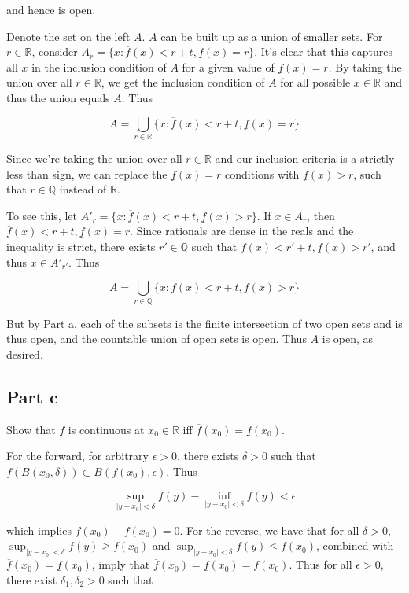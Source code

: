 \documentclass{article}
\newcommand{\R}{\mathbb{R}}
\newcommand{\Q}{\mathbb{Q}}
\begin{document}
and hence is open.

Denote the set on the left $A$. $A$ can be built up as a union of smaller sets. For $r \in \R$, consider $A_r = \{ x: \overline{f}(x)<r+t, \underline{f}(x) = r \}$. It's clear that this captures all $x$ in the inclusion condition of $A$ for a given value of $\underline{f}(x) = r$. By taking the union over all $r \in \R$, we get the inclusion condition of $A$ for all possible $x \in \R$ and thus the union equals $A$. Thus

\[
A = \bigcup_{r \in \R} \{ x: \overline{f}(x)<r+t, \underline{f}(x) = r \}
\] 

Since we're taking the union over all $r \in \R$ and our inclusion criteria is a strictly less than sign, we can replace the $\underline{f}(x) = r$ conditions with $\underline{f}(x) > r$, such that $r \in \Q$ instead of $\R$.

To see this, let $A'_{r} = \{ x: \overline{f}(x)<r+t, \underline{f}(x) > r \}$. If $x \in A_r$, then $\overline{f}(x) < r+t, \underline{f}(x) = r$. Since rationals are dense in the reals and the inequality is strict, there exists $r' \in \Q$ such that $\overline{f}(x)<r'+t, \underline{f}(x) > r'$, and thus $x \in A'_{r'}$. Thus

\[
A = \bigcup_{r \in \Q} \{ x: \overline{f}(x)<r+t, \underline{f}(x) > r \}
\]

But by Part a, each of the subsets is the finite intersection of two open sets and is thus open, and the countable union of open sets is open. Thus $A$ is open, as desired.

\subsection*{Part c}

Show that $f$ is continuous at $x_0 \in \R$ iff $\overline{f}(x_0) = \underline{f}(x_0)$.

For the forward, for arbitrary $\epsilon > 0$, there exists $\delta > 0$ such that $f(B(x_0, \delta)) \subset B(f(x_0), \epsilon)$. Thus

\[
\sup_{|y-x_0|<\delta} f(y) - \inf_{|y-x_0|<\delta} f(y) < \epsilon
\]

which implies $\overline{f}(x_0) - \underline{f}(x_0) = 0$. For the reverse, we have that for all $\delta > 0$, $\sup_{|y-x_0|<\delta} f(y) \geq f(x_0)$ and $\sup_{|y-x_0|<\delta} f(y) \leq f(x_0)$, combined with $\overline{f}(x_0) = \underline{f}(x_0)$, imply that $\overline{f}(x_0) = \underline{f}(x_0) = f(x_0)$. Thus for all $\epsilon > 0$, there exist $\delta_1, \delta_2 > 0$ such that
\end{document}

